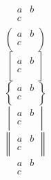 \documentclass{article}
\begin{document}
\[ \begin{matrix} a & b \\ c \\ \end{matrix} \]
\[ \begin{pmatrix} a & b \\ c \\ \end{pmatrix} \]
\[ \begin{bmatrix} a & b \\ c \\ \end{bmatrix} \]
\[ \begin{Bmatrix} a & b \\ c \\ \end{Bmatrix} \]
\[ \begin{vmatrix} a & b \\ c \\ \end{vmatrix} \]
\[ \begin{Vmatrix} a & b \\ c \\ \end{Vmatrix} \]
\[ \begin{smallmatrix} a & b \\ c \\ \end{smallmatrix} \]
\end{document}
